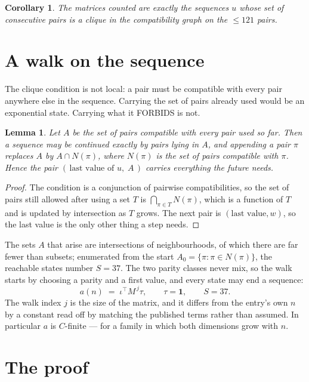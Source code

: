 \documentclass[11pt,a4paper]{article}
\theoremstyle{plain}
\newtheorem{lemma}[theorem]{Lemma}
\newtheorem{corollary}[theorem]{Corollary}
\theoremstyle{definition}
\begin{document}
\begin{corollary}
The matrices counted are exactly the sequences $u$ whose set of consecutive pairs is a clique in
the compatibility graph on the $\le 121$ pairs.
\end{corollary}

\section{A walk on the sequence}

The clique condition is not local: a pair must be compatible with every pair anywhere else in
the sequence. Carrying the set of pairs already used would be an exponential state. Carrying
what it FORBIDS is not.

\begin{lemma}\label{lem:lump}
Let $A$ be the set of pairs compatible with every pair used so far. Then a sequence may be
continued exactly by pairs lying in $A$, and appending a pair $\pi$ replaces $A$ by
$A\cap N(\pi)$, where $N(\pi)$ is the set of pairs compatible with $\pi$. Hence the pair
$(\,\text{last value of }u,\;A\,)$ carries everything the future needs.
\end{lemma}

\begin{proof}
The condition is a conjunction of pairwise compatibilities, so the set of pairs still allowed
after using a set $T$ is $\bigcap_{\pi\in T}N(\pi)$, which is a function of $T$ and is updated
by intersection as $T$ grows. The next pair is $(\text{last value},w)$, so the last value is
the only other thing a step needs.
\end{proof}

The sets $A$ that arise are intersections of neighbourhoods, of which there are far fewer than
subsets; enumerated from the start $A_0=\{\pi:\pi\in N(\pi)\}$, the reachable states number
$S=37$. The two parity classes never mix, so the walk starts by choosing a parity and a first
value, and every state may end a sequence:
\[
a(n)\;=\;\iota^{\!\top}M^{\,j}\tau ,\qquad \tau=\mathbf{1},\qquad S=37.
\]
The walk index $j$ is the size of the matrix, and it differs from the entry's own $n$ by a
constant read off by matching the published terms rather than assumed. In particular $a$ is
$C$-finite --- for a family in which both dimensions grow with $n$.

\section{The proof}
\end{document}
